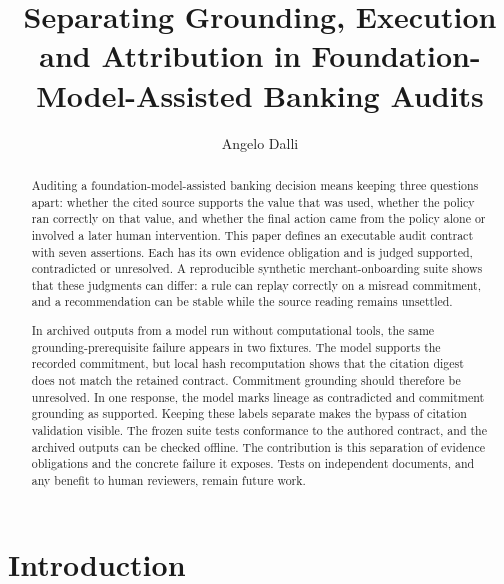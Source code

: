 \documentclass[sigconf,nonacm]{acmart}
\begin{document}
\title[Separating Grounding, Execution and Attribution]{Separating Grounding, Execution and Attribution in Foundation-Model-Assisted Banking Audits}
\author{Angelo Dalli}
\renewcommand{\shortauthors}{Angelo Dalli}
\begin{abstract}
Auditing a foundation-model-assisted banking decision means keeping three questions apart: whether the cited source supports the value that was used, whether the policy ran correctly on that value, and whether the final action came from the policy alone or involved a later human intervention. This paper defines an executable audit contract with seven assertions. Each has its own evidence obligation and is judged supported, contradicted or unresolved. A reproducible synthetic merchant-onboarding suite shows that these judgments can differ: a rule can replay correctly on a misread commitment, and a recommendation can be stable while the source reading remains unsettled.

In archived outputs from a model run without computational tools, the same grounding-prerequisite failure appears in two fixtures. The model supports the recorded commitment, but local hash recomputation shows that the citation digest does not match the retained contract. Commitment grounding should therefore be unresolved. In one response, the model marks lineage as contradicted and commitment grounding as supported. Keeping these labels separate makes the bypass of citation validation visible. The frozen suite tests conformance to the authored contract, and the archived outputs can be checked offline. The contribution is this separation of evidence obligations and the concrete failure it exposes. Tests on independent documents, and any benefit to human reviewers, remain future work.
\end{abstract}
\maketitle
{}
\section{Introduction}
\end{document}
